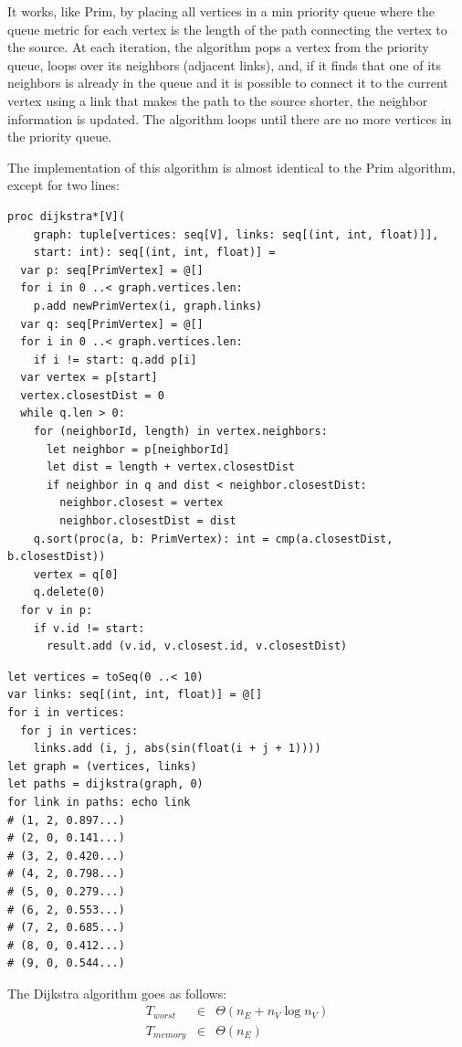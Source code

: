\documentclass[justified, sixbynine]{tufte-book}
\def\ft{\small\tt}
\theoremstyle{plain}%
\newtheorem * {corollary}{Corollary}
\theoremstyle{definition}
\theoremstyle{remark}
\newtheorem * {remark}{Remark}
\newtheorem * {note}{Note}
\begin{document}
\begin{fullwidth}
It works, like Prim, by placing all vertices in a min priority queue where the queue metric for each vertex is the length of the path connecting the vertex to the source. At each iteration, the algorithm pops a vertex from the priority queue, loops over its neighbors (adjacent links), and, if it finds that one of its neighbors is already in the queue and it is possible to connect it to the current vertex using a link that makes the path to the source shorter, the neighbor information is updated. The algorithm loops until there are no more vertices in the priority queue.

The implementation of this algorithm is almost identical to the Prim algorithm, except for two lines:

\begin{lstlisting}[caption={in file: {\ft nlib.nim}}]
proc dijkstra*[V](
    graph: tuple[vertices: seq[V], links: seq[(int, int, float)]],
    start: int): seq[(int, int, float)] =
  var p: seq[PrimVertex] = @[]
  for i in 0 ..< graph.vertices.len:
    p.add newPrimVertex(i, graph.links)
  var q: seq[PrimVertex] = @[]
  for i in 0 ..< graph.vertices.len:
    if i != start: q.add p[i]
  var vertex = p[start]
  vertex.closestDist = 0
  while q.len > 0:
    for (neighborId, length) in vertex.neighbors:
      let neighbor = p[neighborId]
      let dist = length + vertex.closestDist
      if neighbor in q and dist < neighbor.closestDist:
        neighbor.closest = vertex
        neighbor.closestDist = dist
    q.sort(proc(a, b: PrimVertex): int = cmp(a.closestDist, b.closestDist))
    vertex = q[0]
    q.delete(0)
  for v in p:
    if v.id != start:
      result.add (v.id, v.closest.id, v.closestDist)
\end{lstlisting}

\begin{lstlisting}
let vertices = toSeq(0 ..< 10)
var links: seq[(int, int, float)] = @[]
for i in vertices:
  for j in vertices:
    links.add (i, j, abs(sin(float(i + j + 1))))
let graph = (vertices, links)
let paths = dijkstra(graph, 0)
for link in paths: echo link
# (1, 2, 0.897...)
# (2, 0, 0.141...)
# (3, 2, 0.420...)
# (4, 2, 0.798...)
# (5, 0, 0.279...)
# (6, 2, 0.553...)
# (7, 2, 0.685...)
# (8, 0, 0.412...)
# (9, 0, 0.544...)
\end{lstlisting}

The Dijkstra algorithm goes as follows:
\begin{eqnarray}
T_{worst} &\in &\Theta (n_E+n_V\log n_V) \\
T_{memory} &\in &\Theta (n_E)
\end{eqnarray}


\end{fullwidth}
\end{document}
